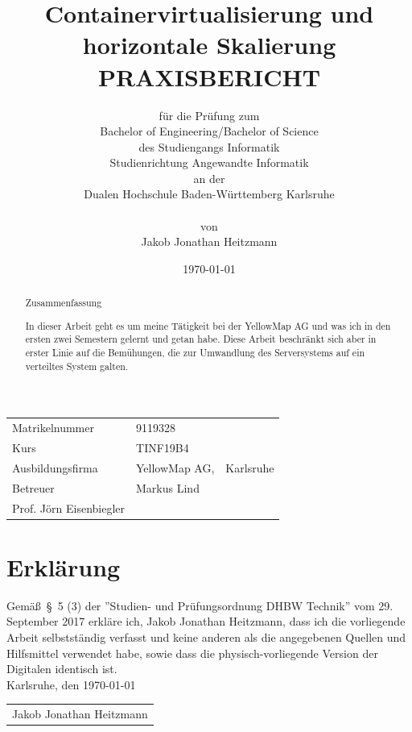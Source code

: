 \documentclass[12pt,a4paper]{scrartcl}
\title{\Large{\bfseries Containervirtualisierung und horizontale Skalierung}\vspace{1cm}
	\large PRAXISBERICHT\vspace{1cm}}
\author{
	\normalsize für die Prüfung zum\\
	\normalsize Bachelor of Engineering/Bachelor of Science\\
	\normalsize des Studiengangs Informatik\\
	\normalsize Studienrichtung Angewandte Informatik\\
	\normalsize an der\\
	\normalsize Dualen Hochschule Baden-Württemberg Karlsruhe\\\\
	\normalsize von\\
	\normalsize Jakob Jonathan Heitzmann
}
\date{\today}
\begin{document}
\maketitle
\vspace*{\fill}
\thispagestyle{empty}



\begin{tabular}{p{5cm}ll}
	Matrikelnummer & 9119328\\
	Kurs & TINF19B4\\
	Ausbildungsfirma & YellowMap AG, & Karlsruhe\\
	Betreuer & Markus Lind\\
	Prof. Jörn Eisenbiegler
\end{tabular}

\newpage


\section*{Erkl\"arung}

Gem\"a\ss\ \S\ 5 (3) der ''Studien- und Pr\"ufungsordnung DHBW Technik'' vom 29. September 2017 erkl\"are ich, Jakob Jonathan Heitzmann, dass ich die vorliegende Arbeit selbstst\"andig verfasst und keine anderen als die angegebenen Quellen und Hilfsmittel verwendet habe, sowie dass die physisch-vorliegende Version der Digitalen identisch ist.\\

\hspace*{0.5cm}
Karlsruhe, den \today

\vspace*{2cm}

\begin{tabular}{@{}l@{}}\hline
\rule{0pt}{2ex}
Jakob Jonathan Heitzmann
\end{tabular}
\newpage


\begin{abstract}
\begin{center}
Zusammenfassung
\end{center}
In dieser Arbeit geht es um meine Tätigkeit bei der YellowMap AG und was ich in den ersten zwei Semestern gelernt und getan habe. Diese Arbeit beschränkt sich aber in erster Linie auf die Bemühungen, die zur Umwandlung des Serversystems auf ein verteiltes System galten.
\end{abstract}
\newpage
\end{document}
